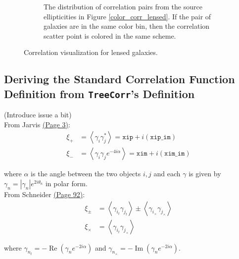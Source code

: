\documentclass[%
 reprint,
 amsmath,amssymb,
 aps,nofootinbib
]{revtex4-1}
\begin{document}
\begin{figure}
\begin{subfigure}{0.44\textwidth}
        \captionsetup{justification=raggedright,singlelinecheck=false}
        \caption{The distribution of correlation pairs from the source ellipticities in Figure \ref{color_corr_lensed}. If the pair of galaxies are in the same color bin, then the correlation scatter point is colored in the same scheme.}
        \label{corr_dist_lensed}
    \end{subfigure}
    \vspace{-.05in}
    \caption{Correlation visualization for lensed galaxies.}
    \label{colored_corr_lensed}
\end{figure}



\newpage

\subsection{Deriving the Standard Correlation Function Definition from \texttt{TreeCorr}'s Definition}

(Introduce issue a bit)\\

From Jarvis \href{http://arxiv.org/pdf/astro-ph/0307393v2.pdf}{(Page 3)}:
\begin{align}
\xi_+&=\left<\gamma_i\gamma_j^*\right>=\texttt{xip}+i(\texttt{xip\_im})\label{s+}\\
\xi_-&=\left<\gamma_i\gamma_je^{-4i\alpha}\right>=\texttt{xim}+i(\texttt{xim\_im})\label{s-}
\end{align}

where $\alpha$ is the angle between the two objects $i,j$ and each $\gamma$ is given by $\gamma_n=|\gamma_n|e^{2i\theta_n}$ in polar form.\\

From Schneider \href{http://arxiv.org/pdf/astro-ph/0509252v1.pdf}{(Page 92)}:
\begin{align}
\xi_\pm&=\left<\gamma_{i_t}\gamma_{j_t}\right>\pm\left<\gamma_{i_\times}\gamma_{j_\times}\right>\label{s+-}\\
\xi_\times&=\left<\gamma_{i_t}\gamma_{j_\times}\right>\label{sx}
\end{align}

where $\gamma_{n_t}=-\operatorname{Re}\left(\gamma_n e^{-2i\alpha}\right)$ and $\gamma_{n_\times}=-\operatorname{Im}\left(\gamma_n e^{-2i\alpha}\right)$.\\
\end{document}
